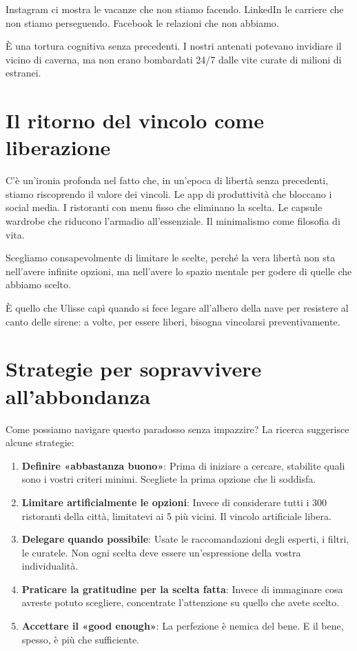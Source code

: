 Instagram ci mostra le vacanze che non stiamo facendo. LinkedIn le carriere che non stiamo perseguendo. Facebook le relazioni che non abbiamo.

È una tortura cognitiva senza precedenti. I nostri antenati potevano invidiare il vicino di caverna, ma non erano bombardati 24/7 dalle vite curate di milioni di estranei.

\section{Il ritorno del vincolo come liberazione}

C'è un'ironia profonda nel fatto che, in un'epoca di libertà senza precedenti, stiamo riscoprendo il valore dei vincoli. Le app di produttività che bloccano i social media. I ristoranti con menu fisso che eliminano la scelta. Le capsule wardrobe che riducono l'armadio all'essenziale. Il minimalismo come filosofia di vita.

Scegliamo consapevolmente di limitare le scelte, perché la vera libertà non sta nell'avere infinite opzioni, ma nell'avere lo spazio mentale per godere di quelle che abbiamo scelto.

È quello che Ulisse capì quando si fece legare all'albero della nave per resistere al canto delle sirene: a volte, per essere liberi, bisogna vincolarsi preventivamente.

\section{Strategie per sopravvivere all'abbondanza}

Come possiamo navigare questo paradosso senza impazzire? La ricerca suggerisce alcune strategie:

\begin{enumerate}
\item \textbf{Definire «abbastanza buono»}: Prima di iniziare a cercare, stabilite quali sono i vostri criteri minimi. Scegliete la prima opzione che li soddisfa.

\item \textbf{Limitare artificialmente le opzioni}: Invece di considerare tutti i 300 ristoranti della città, limitatevi ai 5 più vicini. Il vincolo artificiale libera.

\item \textbf{Delegare quando possibile}: Usate le raccomandazioni degli esperti, i filtri, le curatele. Non ogni scelta deve essere un'espressione della vostra individualità.

\item \textbf{Praticare la gratitudine per la scelta fatta}: Invece di immaginare cosa avreste potuto scegliere, concentrate l'attenzione su quello che avete scelto.

\item \textbf{Accettare il «good enough»}: La perfezione è nemica del bene. E il bene, spesso, è più che sufficiente.
\end{enumerate}

